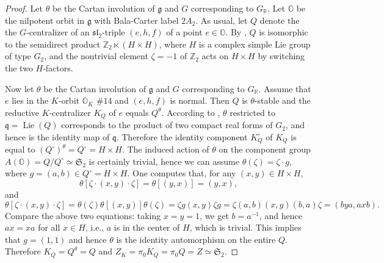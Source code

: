 \documentclass[11pt, a4paper]{amsart}
\newcommand{\orb}{\mathbb{O}}
\newcommand{\orbk}{\orb_{K}}
\newcommand{\Z}{\mathbb{Z}}
\newcommand{\fg}{\mathfrak{g}}
\newcommand{\fq}{\mathfrak{q}}
\newcommand{\fS}{\mathfrak{S}}
\DeclareMathOperator{\Lie}{Lie}
\newcommand{\R}{\mathbb{R}}
\newcommand{\GR}{G_\R}
\newcommand{\slf}{\mathfrak{sl}}
\theoremstyle{definition}
\numberwithin{equation}{section}
\begin{document}
\begin{proof}
	Let $\theta$ be the Cartan involution of $\fg$ and $G$ corresponding to $\GR$.
	Let $\orb$ be the nilpotent orbit in $\fg$ with Bala-Carter label $2A_2$. As usual, let $Q$ denote the the $G$-centralizer of an $\slf_2$-triple $(e,h,f)$ of a point $e \in \orb$.
	By \cite[Table 5]{Alexeevski}, $Q$ is isomorphic to the semidirect product $\Z_2 \ltimes (H \times H)$, where $H$ is a complex simple Lie group of type $G_2$, and the nontrivial element $\zeta=-1$ of $\Z_2$ acts on $H \times H$ by switching the two $H$-factors. 
	
	Now let $\theta$ be the Cartan involution of $\fg$ and $G$ corresponding to $\GR$. Assume that $e$ lies in the $K$-orbit $\orbk$ $\# 14$ and $(e,h,f)$ is normal. Then $Q$ is $\theta$-stable and the reductive $K$-centralizer $K_Q$ of $e$ equals $Q^\theta$. According to \cite[Table XIV]{Djokovic:centralizer_inner}, $\theta$ restricted to $\fq = \Lie(Q)$ corresponds to the product of two compact real forms of $G_2$, and hence is the identity map of $\fq$. Therefore the identity component $K_Q^\circ$ of $K_Q$ is equal to $(Q^\circ)^\theta = Q^\circ = H \times H$. The induced action of $\theta$ on the component group $A(\orb) = Q/Q^\circ \simeq \fS_2$ is certainly trivial, hence we can assume $\theta(\zeta) = \zeta \cdot g$, where $g = (a,b) \in Q^\circ = H \times H$.  One computes that, for any $(x,y) \in H \times H$,
		\[ \theta[\zeta \cdot (x,y) \cdot \zeta] = \theta[(y,x)] = (y,x),\]
	and 
		\[  \theta[\zeta \cdot (x,y)  \cdot \zeta] = \theta(\zeta)\theta[(x,y)]\theta(\zeta) = \zeta g (x,y) \zeta g  = \zeta (a,b)(x,y)(b,a) \zeta =( bya, axb ).\]
	Compare the above two equations: taking $x = y = 1$, we get $b = a^{-1}$, and hence $ax = xa$ for all $x \in H$, i.e., $a$ is in the center of $H$, which is trivial. This implies that $g=(1,1)$ and hence $\theta$ is the identity automorphism on the entire $Q$. Therefore $K_Q = Q^\theta = Q$ and $Z_K = \pi_0 K_Q = \pi_0 Q = Z \simeq \fS_2$.
\end{proof}


\printbibliography
\end{document}
